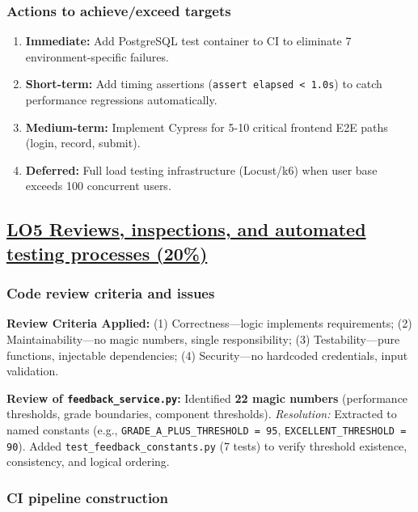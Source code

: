 \documentclass[sigconf]{acmart}
\begin{document}
\subsubsection{Actions to achieve/exceed targets}

\begin{enumerate}[noitemsep]
    \item \textbf{Immediate:} Add PostgreSQL test container to CI to eliminate 7 environment-specific failures.
    \item \textbf{Short-term:} Add timing assertions (\texttt{assert elapsed < 1.0s}) to catch performance regressions automatically.
    \item \textbf{Medium-term:} Implement Cypress for 5-10 critical frontend E2E paths (login, record, submit).
    \item \textbf{Deferred:} Full load testing infrastructure (Locust/k6) when user base exceeds 100 concurrent users.
\end{enumerate}

\subsection{\href{https://github.com/JoshAn0107/speakright.uk/blob/main/LO5_COMPLETE.md}{LO5 Reviews, inspections, and automated testing processes (20\%)}}

\subsubsection{Code review criteria and issues}

\textbf{Review Criteria Applied:} (1) Correctness---logic implements requirements; (2) Maintainability---no magic numbers, single responsibility; (3) Testability---pure functions, injectable dependencies; (4) Security---no hardcoded credentials, input validation.

\textbf{Review of \texttt{feedback\_service.py}:} Identified \textbf{22 magic numbers} (performance thresholds, grade boundaries, component thresholds). \textit{Resolution:} Extracted to named constants (e.g., \texttt{GRADE\_A\_PLUS\_THRESHOLD = 95}, \texttt{EXCELLENT\_THRESHOLD = 90}). Added \texttt{test\_feedback\_constants.py} (7 tests) to verify threshold existence, consistency, and logical ordering.

\subsubsection{CI pipeline construction}
\end{document}
